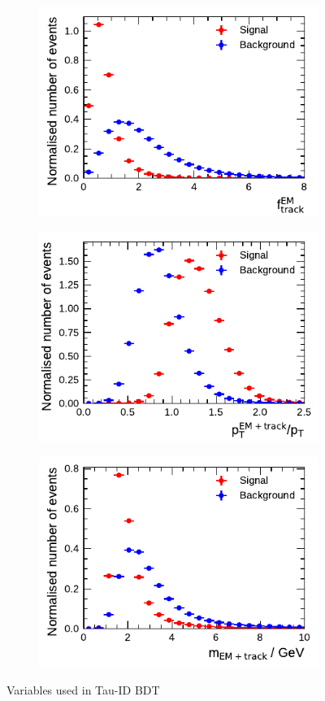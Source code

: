 \begin{figure}[!ht]
\begin{subfigure}{0.5\textwidth}
    \includegraphics{./figures/baseline_bdt_vars/3p/EMPOverTrkSysP.pdf}
  \end{subfigure}%
  \begin{subfigure}{0.5\textwidth}
    \centering
    \includegraphics{./figures/baseline_bdt_vars/3p/ptRatioEflowApprox.pdf}
  \end{subfigure}
  \begin{subfigure}{0.5\textwidth}
    \centering
    \includegraphics{./figures/baseline_bdt_vars/3p/mEflowApprox.pdf}
  \end{subfigure}
  \caption[]{Variables used in Tau-ID BDT}
\end{figure}

